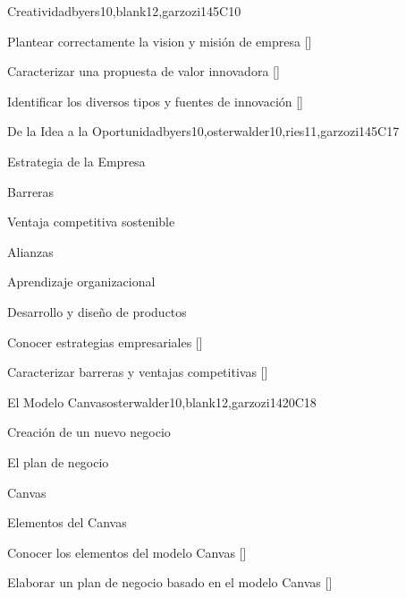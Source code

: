 \begin{syllabus}
\begin{unit}{}{Creatividad}{byers10,blank12,garzozi14}{5}{C10}
       \begin{learningoutcomes} 
         \item Plantear correctamente la vision y misión de empresa  [\Usage]
        \item Caracterizar una propuesta de valor innovadora  [\Assessment]
         \item Identificar los diversos tipos y fuentes de innovación  [\Familiarity]
      \end{learningoutcomes} 
   \end{unit}
   
   \begin{unit}{}{De la Idea a la Oportunidad}{byers10,osterwalder10,ries11,garzozi14}{5}{C17}
   \begin{topics}
         \item Estrategia de la Empresa
         \item Barreras 
         \item Ventaja competitiva sostenible
         \item Alianzas
         \item Aprendizaje organizacional
         \item Desarrollo y diseño de productos
      \end{topics}
   
     \begin{learningoutcomes} 
         \item Conocer estrategias empresariales  [\Familiarity]
         \item Caracterizar barreras y ventajas competitivas   [\Familiarity]
          
       \end{learningoutcomes} 
   \end{unit}
   
   \begin{unit}{}{El Modelo Canvas}{osterwalder10,blank12,garzozi14}{20}{C18}
      \begin{topics}
         \item Creación de un nuevo negocio
         \item El plan de negocio 
         \item Canvas
         \item Elementos del Canvas
      \end{topics}
   
     \begin{learningoutcomes} 
         \item Conocer los elementos del modelo Canvas  [\Usage]
         \item Elaborar un plan de negocio basado en el modelo Canvas  [\Usage]
       \end{learningoutcomes} 
   \end{unit}
   

\end{syllabus}
